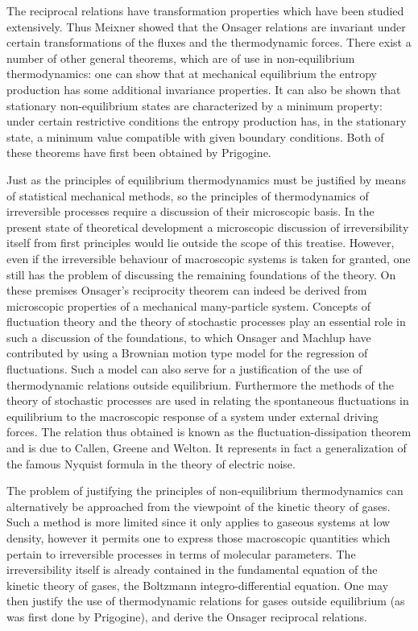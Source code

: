 The reciprocal relations have transformation properties which have been studied extensively. Thus Meixner showed that the Onsager relations are invariant under certain transformations of the fluxes and the thermodynamic forces. There exist a number of other general theorems, which are of use in non-equilibrium thermodynamics: one can show that at mechanical equilibrium the entropy production has some additional invariance properties. It can also be shown that stationary non-equilibrium states are characterized by a minimum property: under certain restrictive conditions the entropy production has, in the stationary state, a minimum value compatible with given boundary conditions. Both of these theorems have first been obtained by Prigogine.


Just as the principles of equilibrium thermodynamics must be justified by means of statistical mechanical methods, so the principles of thermodynamics of irreversible processes require a discussion of their microscopic basis. In the present state of theoretical development a microscopic discussion of irreversibility itself from first principles would lie outside the scope of this treatise. However, even if the irreversible behaviour of macroscopic systems is taken for granted, one still has the problem of discussing the remaining foundations of the theory. On these premises Onsager's reciprocity theorem can indeed be derived from microscopic properties of a mechanical many-particle system. Concepts of fluctuation theory and the theory of stochastic processes play an essential role in such a discussion of the foundations, to which Onsager and Machlup have contributed by using a Brownian motion type model for the regression of fluctuations. Such a model can also serve for a justification of the use of thermodynamic relations outside equilibrium. Furthermore the methods of the theory of stochastic processes are used in relating the spontaneous fluctuations in equilibrium to the macroscopic response of a system under external driving forces. The relation thus obtained is known as the fluctuation-dissipation theorem and is due to Callen, Greene and Welton. It represents in fact a generalization of the famous Nyquist formula in the theory of electric noise.

The problem of justifying the principles of non-equilibrium thermodynamics can alternatively be approached from the viewpoint of the kinetic theory of gases. Such a method is more limited since it only applies to gaseous systems at low density, however it permits one to express those macroscopic quantities which pertain to irreversible processes in terms of molecular parameters. The irreversibility itself is already contained in the fundamental equation of the kinetic theory of gases, the Boltzmann integro-differential equation. One may then justify the use of thermodynamic relations for gases outside equilibrium (as was first done by Prigogine), and derive the Onsager reciprocal relations.

